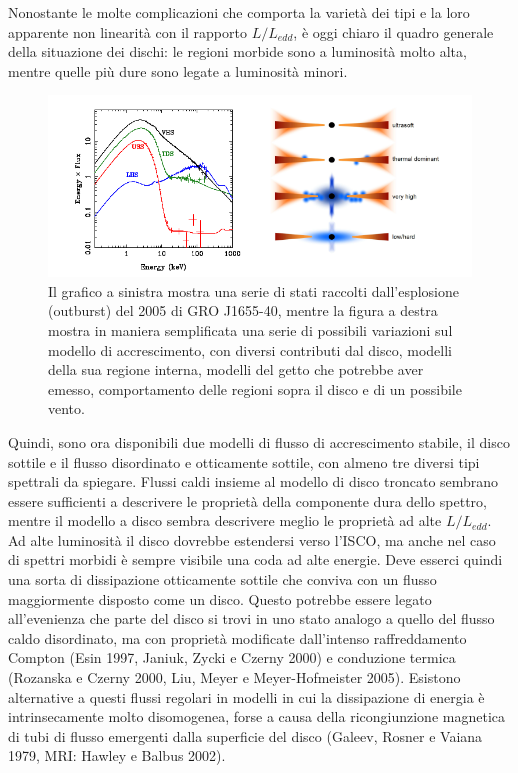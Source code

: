 \documentclass[a4paperbi]{article}
\begin{document}
	Nonostante le molte complicazioni che comporta la varietà dei tipi e la loro apparente non linearità con il rapporto $L/L_{edd}$, è oggi chiaro il quadro generale della situazione dei dischi: le regioni morbide sono a luminosità molto alta, mentre quelle più dure sono legate a luminosità minori.
	
	\begin{figure}[H]
		\centering
		\includegraphics[width=0.8\linewidth]{SpectralTypes}
		\caption{Il grafico a sinistra mostra una serie di stati raccolti dall'esplosione (outburst) del 2005 di GRO J1655-40, mentre la figura a destra mostra in maniera semplificata una serie di possibili variazioni sul modello di accrescimento, con diversi contributi dal disco, modelli della sua regione interna, modelli del getto che potrebbe aver emesso, comportamento delle regioni sopra il disco e di un possibile vento.}
		\label{fig:SpectralTypes}
	\end{figure}
	
	Quindi, sono ora disponibili due modelli di flusso di accrescimento stabile, il disco sottile e il flusso disordinato e otticamente sottile, con almeno tre diversi tipi spettrali da spiegare. Flussi caldi insieme al modello di disco troncato sembrano essere sufficienti a descrivere le proprietà della componente dura dello spettro, mentre il modello a disco sembra descrivere meglio le proprietà ad alte $L/L_{edd}$. Ad alte luminosità il disco dovrebbe estendersi verso l'ISCO, ma anche nel caso di spettri morbidi è sempre	visibile una coda ad alte energie. Deve esserci quindi una sorta di dissipazione otticamente sottile che conviva con un flusso maggiormente disposto come un disco. Questo potrebbe essere legato all'evenienza che parte del disco si trovi in uno stato analogo a quello del flusso caldo disordinato, ma con proprietà modificate dall'intenso raffreddamento Compton (Esin 1997, Janiuk, Zycki e Czerny 2000) e conduzione termica (Rozanska e Czerny 2000, Liu, Meyer e Meyer-Hofmeister 2005). Esistono alternative a questi flussi regolari in modelli in cui la dissipazione di energia è intrinsecamente molto disomogenea, forse a causa della ricongiunzione magnetica di tubi di flusso emergenti dalla superficie del disco (Galeev, Rosner e Vaiana 1979, MRI: Hawley e Balbus 2002).
\end{document}
